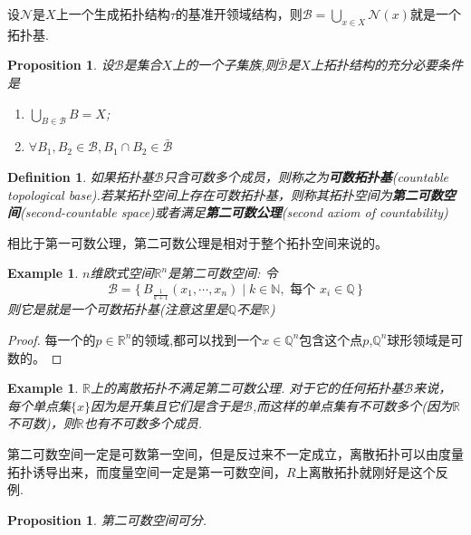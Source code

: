 \documentclass{article}
\newtheorem{proposition}[theorem]{Proposition}
\newtheorem{example}[theorem]{Example}
\newtheorem{definition}[theorem]{Definition}
\newcommand\Set[2]{\{\,#1\mid#2\,\}} %
\begin{document}
设$\mathcal{N}$是$X$上一个生成拓扑结构$\tau$的基准开领域结构，则$\mathscr{B}=\bigcup\limits_{x \in X}\mathcal{N}(x)$就是一个拓扑基.

\begin{proposition}
设$\mathscr{B}$是集合$X$上的一个子集族,则$\bar{\mathscr{B}}$是$X$上拓扑结构的充分必要条件是
\begin{enumerate}
	\item $\bigcup\limits_{B \in \mathscr{B}}B = X$;
	\item $\forall B_1,B_2 \in \mathscr{B},B_1 \cap B_2 \in \bar{\mathscr{B}}$
\end{enumerate}
\end{proposition}

\begin{definition}
如果拓扑基$\mathscr{B}$只含可数多个成员，则称之为\textbf{可数拓扑基}(countable topological base).若某拓扑空间上存在可数拓扑基，则称其拓扑空间为\textbf{第二可数空间}(second-countable space)或者满足\textbf{第二可数公理}(second axiom of countability)
\end{definition}

相比于第一可数公理，第二可数公理是相对于整个拓扑空间来说的。

\begin{example}
$n$维欧式空间$\mathbb{R}^n$是第二可数空间: 令\[\mathscr{B}=\Set{B_{\frac{1}{k+1}}(x_1,\cdots,x_n)}{k \in \mathbb{N},\text{ 每个 } x_i \in \mathbb{Q}}\]则它是就是一个可数拓扑基(注意这里是$\mathbb{Q}$不是$\mathbb{R}$)
\end{example}

\begin{proof}
每一个的$p \in \mathbb{R}^n$的领域,都可以找到一个$x \in \mathbb{Q}^n$包含这个点$p$,$\mathbb{Q}^n$球形领域是可数的。
\end{proof}

\begin{example}
$\mathbb{R}$上的离散拓扑不满足第二可数公理. 对于它的任何拓扑基$\mathscr{B}$来说，每个单点集$\{x\}$因为是开集且它们是含于是$\mathscr{B}$,而这样的单点集有不可数多个(因为$\mathbb{R}$不可数)，则$\mathbb{R}$也有不可数多个成员.
\end{example}

第二可数空间一定是可数第一空间，但是反过来不一定成立，离散拓扑可以由度量拓扑诱导出来，而度量空间一定是第一可数空间，$R$上离散拓扑就刚好是这个反例.

\begin{proposition}
第二可数空间可分.
\end{proposition}
\end{document}
